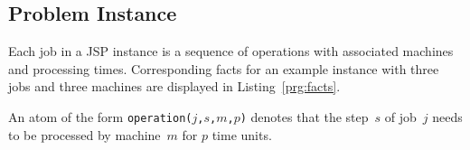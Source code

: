 \documentclass{tlp} %
\begin{document}
\subsection{Problem Instance}\label{subsec:instance}
% 
%
Each job in a JSP instance is a sequence of operations with associated
machines and processing times.
Corresponding facts for an example instance with three jobs and three
machines are displayed in Listing~\ref{prg:facts}.
%

%
An atom of the form
\lstinline{operation(}$j$\lstinline{,}$s$\lstinline{,}$m$\lstinline{,}$p$\lstinline{)}
denotes that the step~$s$ of job~$j$ needs to be processed by machine~$m$ for $p$ time units.
\end{document}
